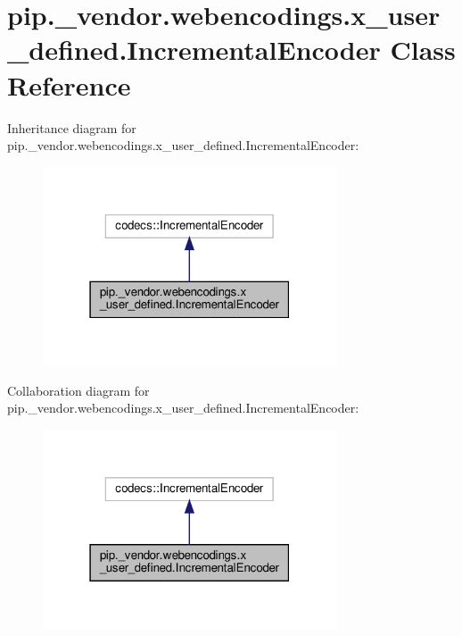 \hypertarget{classpip_1_1__vendor_1_1webencodings_1_1x__user__defined_1_1IncrementalEncoder}{}\section{pip.\+\_\+vendor.\+webencodings.\+x\+\_\+user\+\_\+defined.\+Incremental\+Encoder Class Reference}
\label{classpip_1_1__vendor_1_1webencodings_1_1x__user__defined_1_1IncrementalEncoder}


Inheritance diagram for pip.\+\_\+vendor.\+webencodings.\+x\+\_\+user\+\_\+defined.\+Incremental\+Encoder\+:
\nopagebreak
\begin{figure}[H]
\begin{center}
\leavevmode
\includegraphics[width=247pt]{classpip_1_1__vendor_1_1webencodings_1_1x__user__defined_1_1IncrementalEncoder__inherit__graph}
\end{center}
\end{figure}


Collaboration diagram for pip.\+\_\+vendor.\+webencodings.\+x\+\_\+user\+\_\+defined.\+Incremental\+Encoder\+:
\nopagebreak
\begin{figure}[H]
\begin{center}
\leavevmode
\includegraphics[width=247pt]{classpip_1_1__vendor_1_1webencodings_1_1x__user__defined_1_1IncrementalEncoder__coll__graph}
\end{center}
\end{figure}
